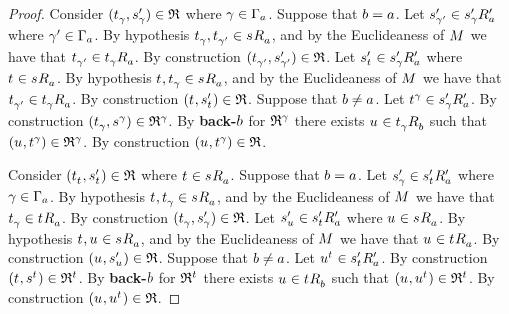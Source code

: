 \begin{proof}
Consider $(\kStateT_\gamma, \kStateSP_\gamma) \in \refinement$ where $\gamma \in \Gamma_\agentA$.
Suppose that $\agentB = \agentA$.
Let $\kStateSP_{\gamma'} \in \kSuccessorsPA{\kStateSP_\gamma}$ where $\gamma' \in \Gamma_\agentA$.
By hypothesis $\kStateT_{\gamma}, \kStateT_{\gamma'} \in \kSuccessorsA{\kStateS}$, and by the Euclideaness of $\kModel$ we have that $\kStateT_{\gamma'} \in \kSuccessorsA{\kStateT_\gamma}$.
By construction $(\kStateT_{\gamma'}, \kStateSP_{\gamma'}) \in \refinement$.
Let $\kStateSP_{\kStateT} \in \kSuccessorsPA{\kStateSP_\gamma}$ where $\kStateT \in \kSuccessorsA{\kStateS}$.
By hypothesis $\kStateT, \kStateT_{\gamma} \in \kSuccessorsA{\kStateS}$, and by the Euclideaness of $\kModel$ we have that $\kStateT_{\gamma'} \in \kSuccessorsA{\kStateT_\gamma}$.
By construction $(\kStateT, \kStateSP_{\kStateT}) \in \refinement$.
Suppose that $\agentB \neq \agentA$.
Let $\kStateT[\gamma] \in \kSuccessorsPA{\kStateSP_\gamma}$.
By construction $(\kStateT_\gamma, \kStateS[\gamma]) \in \refinement^\gamma$.
By {\bf back-$\agentB$} for $\refinement^\gamma$ there exists $\kStateU \in \kSuccessorsB{\kStateT_\gamma}$ such that $(\kStateU, \kStateT[\gamma]) \in \refinement^\gamma$.
By construction $(\kStateU, \kStateT[\gamma]) \in \refinement$.

Consider $(\kStateT_{\kStateT}, \kStateSP_{\kStateT}) \in \refinement$ where $\kStateT \in \kSuccessorsA{\kStateS}$.
Suppose that $\agentB = \agentA$.
Let $\kStateSP_{\gamma} \in \kSuccessorsPA{\kStateSP_{\kStateT}}$ where $\gamma \in \Gamma_\agentA$.
By hypothesis $\kStateT, \kStateT_{\gamma} \in \kSuccessorsA{\kStateS}$, and by the Euclideaness of $\kModel$ we have that $\kStateT_{\gamma} \in \kSuccessorsA{\kStateT}$.
By construction $(\kStateT_{\gamma}, \kStateSP_{\gamma}) \in \refinement$.
Let $\kStateSP_{\kStateU} \in \kSuccessorsPA{\kStateSP_{\kStateT}}$ where $\kStateU \in \kSuccessorsA{\kStateS}$.
By hypothesis $\kStateT, \kStateU \in \kSuccessorsA{\kStateS}$, and by the Euclideaness of $\kModel$ we have that $\kStateU \in \kSuccessorsA{\kStateT}$.
By construction $(\kStateU, \kStateSP_{\kStateU}) \in \refinement$.
Suppose that $\agentB \neq \agentA$.
Let $\kStateU[\kStateT] \in \kSuccessorsPA{\kStateSP_{\kStateT}}$.
By construction $(\kStateT, \kStateS[\kStateT]) \in \refinement^{\kStateT}$.
By {\bf back-$\agentB$} for $\refinement^{\kStateT}$ there exists $\kStateU \in \kSuccessorsB{\kStateT}$ such that $(\kStateU, \kStateU[\kStateT]) \in \refinement^{\kStateT}$.
By construction $(\kStateU, \kStateU[\kStateT]) \in \refinement$.


\end{proof}
